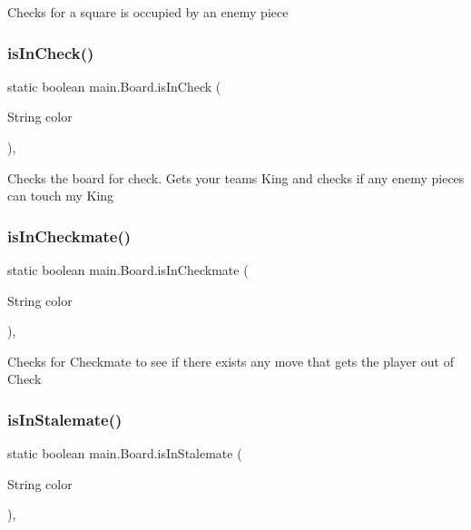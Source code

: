 Checks for a square is occupied by an enemy piece \mbox{\label{classmain_1_1_board_acc973c8cc2e9c539fed65bfc3eed5e8f}} 
\subsubsection{\texorpdfstring{is\+In\+Check()}{isInCheck()}}
{\footnotesize\ttfamily static boolean main.\+Board.\+is\+In\+Check (\begin{DoxyParamCaption}\item[{String}]{color }\end{DoxyParamCaption})\hspace{0.3cm}{\ttfamily [inline]}, {\ttfamily [static]}}

Checks the board for check. Gets your team\textquotesingle{}s King and checks if any enemy pieces can touch my King \mbox{\label{classmain_1_1_board_a7d699e1aaf245c0fab5b1dde84b81d04}} 
\subsubsection{\texorpdfstring{is\+In\+Checkmate()}{isInCheckmate()}}
{\footnotesize\ttfamily static boolean main.\+Board.\+is\+In\+Checkmate (\begin{DoxyParamCaption}\item[{String}]{color }\end{DoxyParamCaption})\hspace{0.3cm}{\ttfamily [inline]}, {\ttfamily [static]}}

Checks for Checkmate to see if there exists any move that gets the player out of Check \mbox{\label{classmain_1_1_board_a415002f647006cb115dbf0e497d526f9}} 
\subsubsection{\texorpdfstring{is\+In\+Stalemate()}{isInStalemate()}}
{\footnotesize\ttfamily static boolean main.\+Board.\+is\+In\+Stalemate (\begin{DoxyParamCaption}\item[{String}]{color }\end{DoxyParamCaption})\hspace{0.3cm}{\ttfamily [inline]}, {\ttfamily [static]}}

